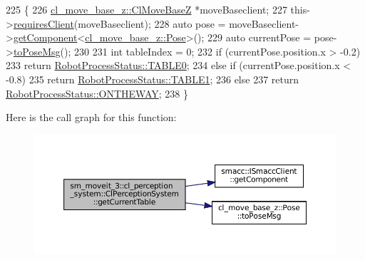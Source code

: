 \begin{DoxyCode}
225   \{
226     \hyperlink{classcl__move__base__z_1_1ClMoveBaseZ}{cl\_move\_base\_z::ClMoveBaseZ} *moveBaseclient;
227     this->\hyperlink{classsmacc_1_1ISmaccClient_a7a9990a2f3e35d547671188d69fee520}{requiresClient}(moveBaseclient);
228     \textcolor{keyword}{auto} pose = moveBaseclient->\hyperlink{classsmacc_1_1ISmaccClient_adef78db601749ca63c19e74a27cb88cc}{getComponent}<\hyperlink{classcl__move__base__z_1_1Pose}{cl\_move\_base\_z::Pose}>();
229     \textcolor{keyword}{auto} currentPose = pose->\hyperlink{classcl__move__base__z_1_1Pose_a9faf8c6b437ff6b19c8bddd692908dca}{toPoseMsg}();
230 
231     \textcolor{keywordtype}{int} tableIndex = 0;
232     \textcolor{keywordflow}{if} (currentPose.position.x > -0.2)
233       \textcolor{keywordflow}{return} \hyperlink{namespacesm__moveit__3_1_1cl__perception__system_a627f57ce4b1b2a0daa56d1b3c51c37eca1fd65c0ced0ead229bf6dd6a59067a4f}{RobotProcessStatus::TABLE0};
234     \textcolor{keywordflow}{else} \textcolor{keywordflow}{if} (currentPose.position.x < -0.8)
235       \textcolor{keywordflow}{return} \hyperlink{namespacesm__moveit__3_1_1cl__perception__system_a627f57ce4b1b2a0daa56d1b3c51c37eca5b22e42e5d94a94037a4486a4976c49d}{RobotProcessStatus::TABLE1};
236     \textcolor{keywordflow}{else}
237       \textcolor{keywordflow}{return} \hyperlink{namespacesm__moveit__3_1_1cl__perception__system_a627f57ce4b1b2a0daa56d1b3c51c37eca92f7ea3097b3fdb1b7a25669cfc1b8bd}{RobotProcessStatus::ONTHEWAY};
238   \}
\end{DoxyCode}
Here is the call graph for this function\+:
\nopagebreak
\begin{figure}[H]
\begin{center}
\leavevmode
\includegraphics[width=350pt]{classsm__moveit__3_1_1cl__perception__system_1_1ClPerceptionSystem_a6abfb0c37f72ea92986d3d007f668dbb_cgraph}
\end{center}
\end{figure}
\mbox{\label{classsm__moveit__3_1_1cl__perception__system_1_1ClPerceptionSystem_a852bf07fda7da87e7bb4ad9336e25042}} 
